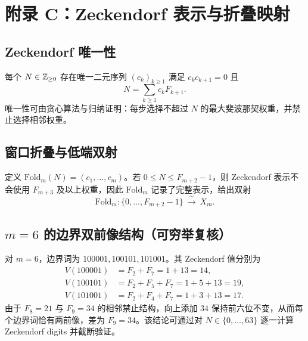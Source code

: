 \section{附录 C：Zeckendorf 表示与折叠映射}

\subsection{Zeckendorf 唯一性}

每个 $N\in\mathbb{Z}_{\ge 0}$ 存在唯一二元序列 $(c_k)_{k\ge 1}$ 满足 $c_kc_{k+1}=0$ 且
\[
N=\sum_{k\ge 1}c_kF_{k+1}.
\]
唯一性可由贪心算法与归纳证明：每步选择不超过 $N$ 的最大斐波那契权重，并禁止选择相邻权重。

\subsection{窗口折叠与低端双射}

定义 $\mathrm{Fold}_m(N)=(c_1,\dots,c_m)$。若 $0\le N\le F_{m+2}-1$，则 Zeckendorf 表示不会使用 $F_{m+3}$ 及以上权重，因此 $\mathrm{Fold}_m$ 记录了完整表示，给出双射
\[
\mathrm{Fold}_m:\{0,\dots,F_{m+2}-1\}\ \xrightarrow{\ \sim\ }\ X_m.
\]

\subsection{\texorpdfstring{$m=6$}{m=6} 的边界双前像结构（可穷举复核）}

对 $m=6$，边界词为 $100001,100101,101001$。其 Zeckendorf 值分别为
\begin{align*}
V(100001)&=F_2+F_7=1+13=14,\\
V(100101)&=F_2+F_5+F_7=1+5+13=19,\\
V(101001)&=F_2+F_4+F_7=1+3+13=17.
\end{align*}
由于 $F_8=21$ 与 $F_9=34$ 的相邻禁止结构，向上添加 $34$ 保持前六位不变，从而每个边界词恰有两前像，差为 $F_9=34$。该结论可通过对 $N\in\{0,\dots,63\}$ 逐一计算 Zeckendorf digits 并截断验证。

